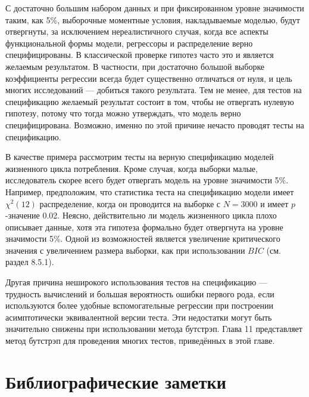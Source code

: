 С достаточно большим набором данных и при фиксированном уровне значимости таким, как 5\%, выборочные моментные условия, накладываемые моделью, будут отвергнуты, за исключением нереалистичного случая, когда все аспекты функциональной формы модели, регрессоры и распределение верно специфицированы. В классической проверке гипотез часто это и является желаемым результатом. В частности, при достаточно большой выборке коэффициенты регрессии всегда будет существенно отличаться от нуля, и цель многих исследований --- добиться такого результата. Тем не менее, для тестов на спецификацию желаемый результат состоит в том, чтобы не отвергать нулевую гипотезу, потому что тогда можно утверждать, что модель верно специфицирована. Возможно, именно по этой причине нечасто проводят тесты на спецификацию.

В качестве примера рассмотрим тесты на верную спецификацию моделей жизненного цикла потребления. Кроме случая, когда выборки малые, исследователь скорее всего будет отвергать модель на уровне значимости 5\%. Например, предположим, что статистика теста на спецификацию модели имеет $\chi^2(12)$ распределение, когда он проводится на выборке с $N = 3000$ и имеет $p$-значение 0.02. Неясно, действительно ли модель жизненного цикла  плохо описывает данные, хотя эта гипотеза формально будет отвергнута на уровне значимости 5\%. Одной из возможностей является увеличение критического значения с увеличением размера выборки, как при  использовании  $BIC$ (см. раздел 8.5.1).

Другая причина неширокого использования тестов на спецификацию --- трудность вычислений и большая вероятность ошибки первого рода, если используются более удобные вспомогательные регрессии при построении асимптотически эквивалентной версии теста. Эти недостатки могут быть значительно снижены при использовании метода бутстрэп. Глава 11 представляет метод бутстрэп для проведения многих тестов, приведённых в этой главе.

\section{Библиографические заметки}

